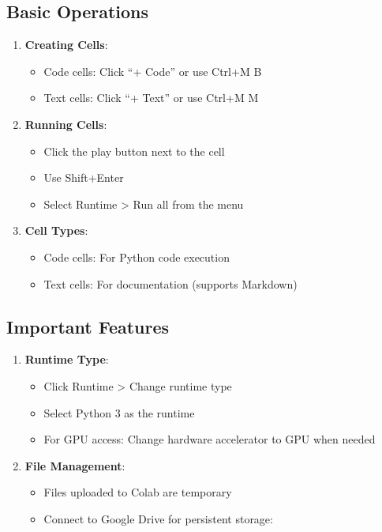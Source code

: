 \documentclass[
  letterpaper,
  DIV=11,
  numbers=noendperiod]{scrreprt}
\providecommand{\tightlist}{%
  \setlength{\itemsep}{0pt}\setlength{\parskip}{0pt}}\usepackage{longtable,booktabs,array}
\begin{document}
\hypertarget{basic-operations}{%
\subsection{Basic Operations}\label{basic-operations}}

\begin{enumerate}
\def\labelenumi{\arabic{enumi}.}
\tightlist
\item
  \textbf{Creating Cells}:

  \begin{itemize}
  \tightlist
  \item
    Code cells: Click ``+ Code'' or use Ctrl+M B
  \item
    Text cells: Click ``+ Text'' or use Ctrl+M M
  \end{itemize}
\item
  \textbf{Running Cells}:

  \begin{itemize}
  \tightlist
  \item
    Click the play button next to the cell
  \item
    Use Shift+Enter
  \item
    Select Runtime \textgreater{} Run all from the menu
  \end{itemize}
\item
  \textbf{Cell Types}:

  \begin{itemize}
  \tightlist
  \item
    Code cells: For Python code execution
  \item
    Text cells: For documentation (supports Markdown)
  \end{itemize}
\end{enumerate}

\hypertarget{important-features}{%
\subsection{Important Features}\label{important-features}}

\begin{enumerate}
\def\labelenumi{\arabic{enumi}.}
\tightlist
\item
  \textbf{Runtime Type}:

  \begin{itemize}
  \tightlist
  \item
    Click Runtime \textgreater{} Change runtime type
  \item
    Select Python 3 as the runtime
  \item
    For GPU access: Change hardware accelerator to GPU when needed
  \end{itemize}
\item
  \textbf{File Management}:

  \begin{itemize}
  \tightlist
  \item
    Files uploaded to Colab are temporary
  \item
    Connect to Google Drive for persistent storage:
  \end{itemize}
\end{enumerate}
\end{document}
